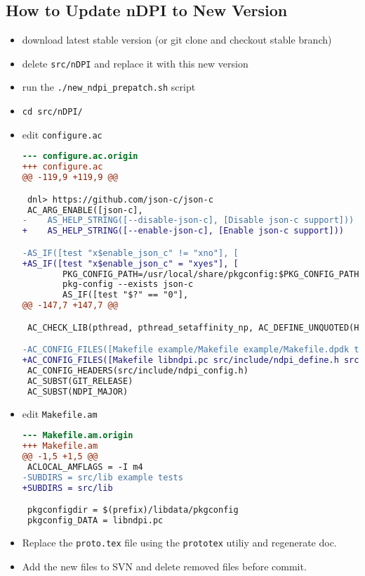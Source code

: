 \documentclass[documentation]{subfiles}
\begin{document}
\subsection{How to Update nDPI to New Version}

\begin{itemize}
    \item download latest stable version (or git clone and checkout stable branch)
    \item delete {\tt src/nDPI} and replace it with this new version
    \item run the {\tt ./new\_ndpi\_prepatch.sh} script
    \item {\tt cd src/nDPI/}
    \item edit {\tt configure.ac}
    \begin{lstlisting}[language=diff]
--- configure.ac.origin
+++ configure.ac
@@ -119,9 +119,9 @@

 dnl> https://github.com/json-c/json-c
 AC_ARG_ENABLE([json-c],
-    AS_HELP_STRING([--disable-json-c], [Disable json-c support]))
+    AS_HELP_STRING([--enable-json-c], [Enable json-c support]))

-AS_IF([test "x$enable_json_c" != "xno"], [
+AS_IF([test "x$enable_json_c" = "xyes"], [
        PKG_CONFIG_PATH=/usr/local/share/pkgconfig:$PKG_CONFIG_PATH
        pkg-config --exists json-c
        AS_IF([test "$?" == "0"],
@@ -147,7 +147,7 @@

 AC_CHECK_LIB(pthread, pthread_setaffinity_np, AC_DEFINE_UNQUOTED(HAVE_PTHREAD_SETAFFINITY_NP, 1, [libc has pthread_setaffinity_np]))

-AC_CONFIG_FILES([Makefile example/Makefile example/Makefile.dpdk tests/Makefile libndpi.pc src/include/ndpi_define.h src/lib/Makefile])
+AC_CONFIG_FILES([Makefile libndpi.pc src/include/ndpi_define.h src/lib/Makefile])
 AC_CONFIG_HEADERS(src/include/ndpi_config.h)
 AC_SUBST(GIT_RELEASE)
 AC_SUBST(NDPI_MAJOR)
    \end{lstlisting}
    \item edit {\tt Makefile.am}
    \begin{lstlisting}[language=diff]
--- Makefile.am.origin
+++ Makefile.am
@@ -1,5 +1,5 @@
 ACLOCAL_AMFLAGS = -I m4
-SUBDIRS = src/lib example tests
+SUBDIRS = src/lib

 pkgconfigdir = $(prefix)/libdata/pkgconfig
 pkgconfig_DATA = libndpi.pc
    \end{lstlisting}
    \item Replace the {\tt proto.tex} file using the {\tt prototex} utiliy and regenerate doc.
    \item Add the new files to SVN and delete removed files before commit.
\end{itemize}
\end{document}
